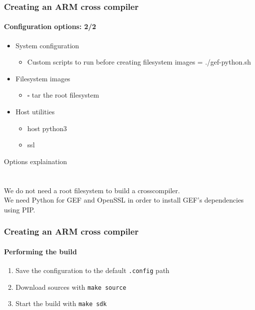 \begin{frame}
  \frametitle{Creating an ARM cross compiler}
  \framesubtitle{Configuration options: 2/2}
  \begin{itemize}
    \toolchainOptionsList
    \item System configuration
    \begin{itemize}
      \item Custom scripts to run before creating filesystem images = ./gef-python.sh
    \end{itemize}
    \item Filesystem images
    \begin{itemize}
      \item $\square$ tar the root filesystem
    \end{itemize}
    \item Host utilities
    \begin{itemize}
      \item host python3
      \item ssl
    \end{itemize}
  \end{itemize}
\end{frame}
 {
  Options explaination \\
  \toolchainOptionsDescription \\
  \gefPythonDescription \\
  We do not need a root filesystem to build a crosscompiler. \\
  We need Python for GEF and OpenSSL in order to install GEF's dependencies using PIP.
}

\begin{frame}
  \frametitle{Creating an ARM cross compiler}
  \framesubtitle{Performing the build}
  \begin{enumerate}
    \item Save the configuration to the default \texttt{.config} path
    \item Download sources with \texttt{make source}
    \item Start the build with \texttt{make sdk}
  \end{enumerate}
\end{frame}
